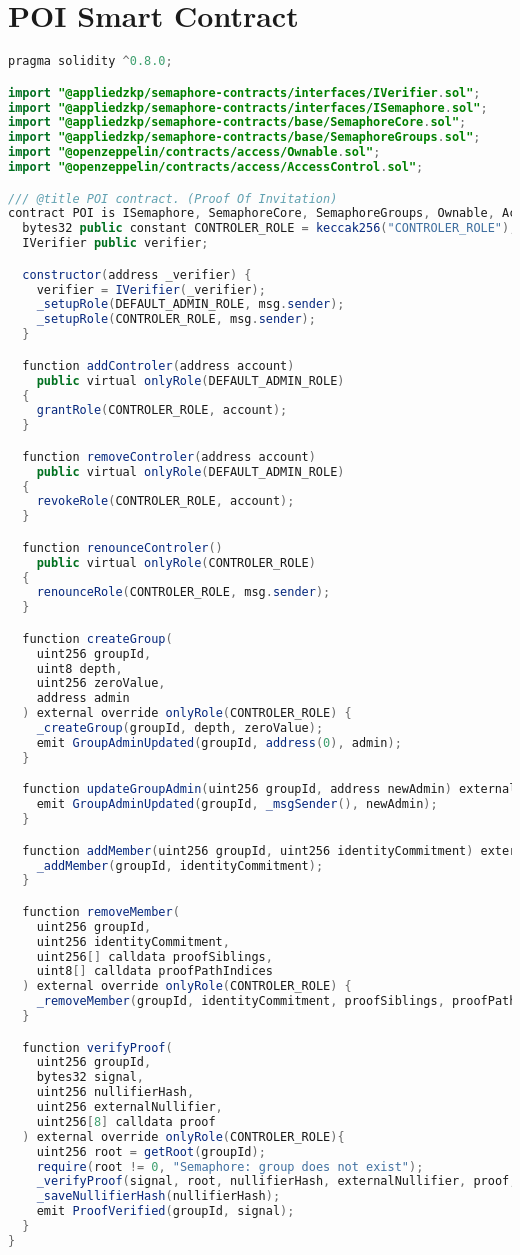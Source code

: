 \documentclass[MSE,Master,english]{twbook}%
\begin{document}
\chapter{POI Smart Contract}
\begin{lstlisting}[language=Java, name={POI Smart Contract}, label={sc:poiContract}]
pragma solidity ^0.8.0;

import "@appliedzkp/semaphore-contracts/interfaces/IVerifier.sol";
import "@appliedzkp/semaphore-contracts/interfaces/ISemaphore.sol";
import "@appliedzkp/semaphore-contracts/base/SemaphoreCore.sol";
import "@appliedzkp/semaphore-contracts/base/SemaphoreGroups.sol";
import "@openzeppelin/contracts/access/Ownable.sol";
import "@openzeppelin/contracts/access/AccessControl.sol";

/// @title POI contract. (Proof Of Invitation)
contract POI is ISemaphore, SemaphoreCore, SemaphoreGroups, Ownable, AccessControl {
  bytes32 public constant CONTROLER_ROLE = keccak256("CONTROLER_ROLE");
  IVerifier public verifier;

  constructor(address _verifier) {
    verifier = IVerifier(_verifier);
    _setupRole(DEFAULT_ADMIN_ROLE, msg.sender);
    _setupRole(CONTROLER_ROLE, msg.sender);
  }

  function addControler(address account)
    public virtual onlyRole(DEFAULT_ADMIN_ROLE)
  {
    grantRole(CONTROLER_ROLE, account);
  }

  function removeControler(address account)
    public virtual onlyRole(DEFAULT_ADMIN_ROLE)
  {
    revokeRole(CONTROLER_ROLE, account);
  }

  function renounceControler()
    public virtual onlyRole(CONTROLER_ROLE)
  {
    renounceRole(CONTROLER_ROLE, msg.sender);
  }

  function createGroup(
    uint256 groupId,
    uint8 depth,
    uint256 zeroValue,
    address admin
  ) external override onlyRole(CONTROLER_ROLE) {
    _createGroup(groupId, depth, zeroValue);
    emit GroupAdminUpdated(groupId, address(0), admin);
  }

  function updateGroupAdmin(uint256 groupId, address newAdmin) external override onlyRole(CONTROLER_ROLE) {
    emit GroupAdminUpdated(groupId, _msgSender(), newAdmin);
  }

  function addMember(uint256 groupId, uint256 identityCommitment) external override onlyRole(CONTROLER_ROLE) {
    _addMember(groupId, identityCommitment);
  }

  function removeMember(
    uint256 groupId,
    uint256 identityCommitment,
    uint256[] calldata proofSiblings,
    uint8[] calldata proofPathIndices
  ) external override onlyRole(CONTROLER_ROLE) {
    _removeMember(groupId, identityCommitment, proofSiblings, proofPathIndices);
  }

  function verifyProof(
    uint256 groupId,
    bytes32 signal,
    uint256 nullifierHash,
    uint256 externalNullifier,
    uint256[8] calldata proof
  ) external override onlyRole(CONTROLER_ROLE){
    uint256 root = getRoot(groupId);
    require(root != 0, "Semaphore: group does not exist");
    _verifyProof(signal, root, nullifierHash, externalNullifier, proof, verifier);
    _saveNullifierHash(nullifierHash);
    emit ProofVerified(groupId, signal);
  }
}
\end{lstlisting}
\end{document}
